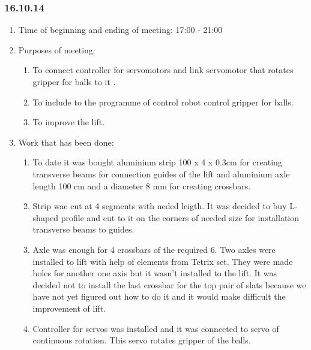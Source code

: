 
\subsubsection{16.10.14}

\begin{enumerate}
	\item Time of beginning and ending of meeting:
	17:00 - 21:00
	\item Purposes of meeting:
	\begin{enumerate}
	  \item To connect controller for servomotors and link servomotor that rotates gripper for balls to it .
	  
	  \item To include to the programme of control robot control gripper for balls.
	  
	  \item To improve the lift.
	  
    \end{enumerate}
	\item Work that has been done:
	\begin{enumerate}
	  \item To date it was bought aluminium strip 100 x 4 x 0.3cm for creating transverse beams for connection guides of the lift and aluminium axle length 100 cm and a diameter 8 mm for creating crossbars.
      
      \item Strip wac cut at 4 segments with neded leigth. It was decided to buy L-shaped profile and cut to it on the corners of needed size for installation transverse beams to guides.
      
      \item Axle was enough for 4 crossbars of the required 6. Two axles were installed to lift with help of elements from Tetrix set. They were made holes for another one axis but it wasn't installed to the lift. It was decided not to install the last crossbar for the top pair of slats because we have not yet figured out how to do it and it would make difficult the improvement of lift.
      
      \item Controller for servos was installed and it was connected to servo of continuous rotation. This servo rotates gripper of the balls.
      

\end{enumerate}
\end{enumerate}

